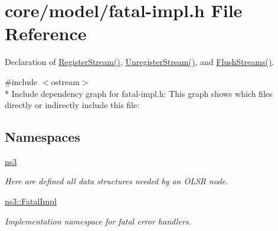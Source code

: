 \hypertarget{fatal-impl_8h}{}\section{core/model/fatal-\/impl.h File Reference}
\label{fatal-impl_8h}


Declaration of \hyperlink{group__fatalimpl_gad552ca3d6d85b95147b8c6a2eb4d4579}{Register\+Stream()}, \hyperlink{group__fatalimpl_ga2bf70e98e990f01912527b4ccfac27d0}{Unregister\+Stream()}, and \hyperlink{group__fatalimpl_gad96fb19ef26235aaccd15e6d2a72382f}{Flush\+Streams()}.  


{\ttfamily \#include $<$ostream$>$}\\*
Include dependency graph for fatal-\/impl.h\+:
This graph shows which files directly or indirectly include this file\+:
\subsection*{Namespaces}
\begin{DoxyCompactItemize}
\item 
 \hyperlink{namespacens3}{ns3}
\begin{DoxyCompactList}\small\item\em Here are defined all data structures needed by an O\+L\+SR node. \end{DoxyCompactList}\item 
 \hyperlink{namespacens3_1_1FatalImpl}{ns3\+::\+Fatal\+Impl}
\begin{DoxyCompactList}\small\item\em Implementation namespace for fatal error handlers. \end{DoxyCompactList}\end{DoxyCompactItemize}
